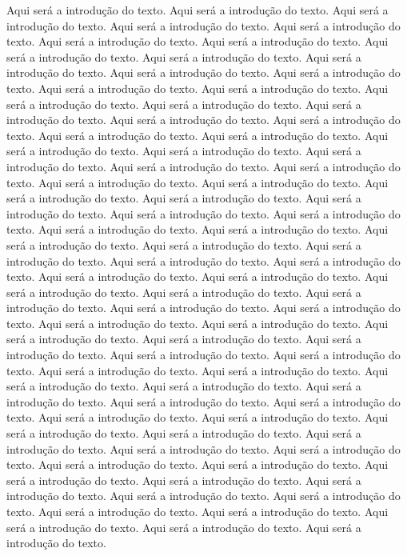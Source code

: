Aqui será a introdução do texto. Aqui será a introdução do texto.
Aqui será a introdução do texto. Aqui será a introdução do texto.
Aqui será a introdução do texto. Aqui será a introdução do texto.
Aqui será a introdução do texto. Aqui será a introdução do texto.
Aqui será a introdução do texto. Aqui será a introdução do texto.
Aqui será a introdução do texto. Aqui será a introdução do texto.
Aqui será a introdução do texto. Aqui será a introdução do texto.
Aqui será a introdução do texto. Aqui será a introdução do texto.
Aqui será a introdução do texto. Aqui será a introdução do texto.
Aqui será a introdução do texto. Aqui será a introdução do texto.
Aqui será a introdução do texto. Aqui será a introdução do texto.
Aqui será a introdução do texto. Aqui será a introdução do texto.
Aqui será a introdução do texto. Aqui será a introdução do texto.
Aqui será a introdução do texto. Aqui será a introdução do texto.
Aqui será a introdução do texto. Aqui será a introdução do texto.
Aqui será a introdução do texto. Aqui será a introdução do texto.
Aqui será a introdução do texto. Aqui será a introdução do texto.
Aqui será a introdução do texto. Aqui será a introdução do texto.
Aqui será a introdução do texto. Aqui será a introdução do texto.
Aqui será a introdução do texto. Aqui será a introdução do texto.
Aqui será a introdução do texto. Aqui será a introdução do texto.
Aqui será a introdução do texto. Aqui será a introdução do texto.
Aqui será a introdução do texto. Aqui será a introdução do texto.
Aqui será a introdução do texto. Aqui será a introdução do texto.
Aqui será a introdução do texto. Aqui será a introdução do texto.
Aqui será a introdução do texto. Aqui será a introdução do texto.
Aqui será a introdução do texto. Aqui será a introdução do texto.
Aqui será a introdução do texto. Aqui será a introdução do texto.
Aqui será a introdução do texto. Aqui será a introdução do texto.
Aqui será a introdução do texto. Aqui será a introdução do texto.
Aqui será a introdução do texto. Aqui será a introdução do texto.
Aqui será a introdução do texto. Aqui será a introdução do texto.
Aqui será a introdução do texto. Aqui será a introdução do texto.
Aqui será a introdução do texto. Aqui será a introdução do texto.
Aqui será a introdução do texto. Aqui será a introdução do texto.
Aqui será a introdução do texto. Aqui será a introdução do texto.
Aqui será a introdução do texto. Aqui será a introdução do texto.
Aqui será a introdução do texto. Aqui será a introdução do texto.
Aqui será a introdução do texto. Aqui será a introdução do texto.
Aqui será a introdução do texto. Aqui será a introdução do texto.
